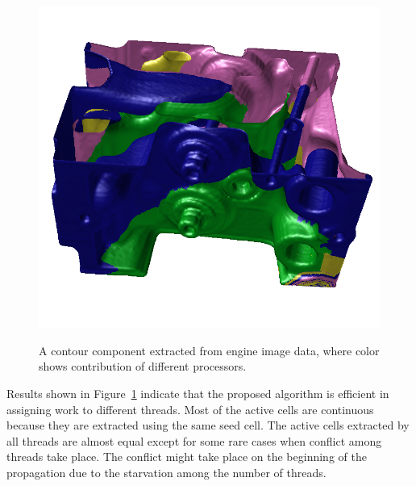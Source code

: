 \documentclass[11pt, b5paper]{report}
\begin{document}
\begin{figure}[htb]
{    \label{fig:engine-3}\includegraphics[width=(\textwidth-1cm)/3]
    {images/mt-engine-23.png}}
  \caption[Engine image data with color-tags for threads]
  {A contour component extracted from engine image data,
    where color shows contribution of different processors.}
  \label{fig:engine}
\end{figure}

Results shown in Figure~\ref{fig:engine} indicate that the proposed
algorithm is efficient in assigning work to different threads.
Most of the active cells are continuous because they are extracted using
the same seed cell. The active cells extracted by all threads are almost
equal except for some rare cases when conflict among threads take place.
The conflict might take place on the beginning of the propagation 
due to the starvation among the number of threads. %
\end{document}
